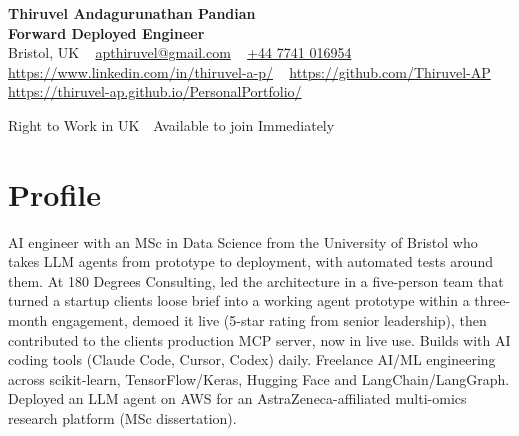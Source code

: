 \documentclass[a4paper,11pt]{article}
\begin{document}
\begin{center}
  {\LARGE\bfseries Thiruvel Andagurunathan Pandian} \\[3pt]
  {\color{headernavy}\small\textbf{Forward Deployed Engineer}} \\[3pt]
  {\small
  Bristol, UK\nobreak\ \,\textbar\, \href{mailto:apthiruvel@gmail.com}{apthiruvel@gmail.com}\nobreak\ \,\textbar\, \href{tel:+447741016954}{+44 7741 016954}\nobreak\ \,\textbar\, \href{https://www.linkedin.com/in/thiruvel-a-p/}{https://www.linkedin.com/in/thiruvel-a-p/}\nobreak\ \,\textbar\, \href{https://github.com/Thiruvel-AP}{https://github.com/Thiruvel-AP}\nobreak\ \,\textbar\, \href{https://thiruvel-ap.github.io/PersonalPortfolio/}{https://thiruvel-ap.github.io/PersonalPortfolio/}}\par\vspace{4pt}
  \noindent{} Right to Work in UK \,\textbar\, Available to join Immediately
\end{center}

\section{Profile}
AI engineer with an MSc in Data Science from the University of Bristol who takes LLM agents from prototype to deployment, with automated tests around them. At 180 Degrees Consulting, led the architecture in a five-person team that turned a startup client\textquotesingle{}s loose brief into a working agent prototype within a three-month engagement, demoed it live (5-star rating from senior leadership), then contributed to the client\textquotesingle{}s production MCP server, now in live use. Builds with AI coding tools (Claude Code, Cursor, Codex) daily. Freelance AI/ML engineering across scikit-learn, TensorFlow/Keras, Hugging Face and LangChain/LangGraph. Deployed an LLM agent on AWS for an AstraZeneca-affiliated multi-omics research platform (MSc dissertation).
\end{document}
